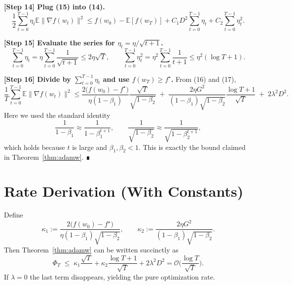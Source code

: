 \documentclass{article}
\begin{document}
\bigskip
\noindent\textbf{[Step 14] Plug (15) into (14).}
\[
\frac{1}{2}\sum_{t=0}^{T-1}\eta_t\mathbb{E}\|\nabla f(w_t)\|^2
\le f(w_0)-\mathbb{E}[f(w_T)]
+ C_1 D^2\sum_{t=0}^{T-1}\eta_t
+ C_2\sum_{t=0}^{T-1}\eta_t^2 .
\tag{16}
\]

\bigskip
\noindent\textbf{[Step 15] Evaluate the series for $\eta_t=\eta/\sqrt{t+1}$.}
\[
\sum_{t=0}^{T-1}\eta_t = \eta\sum_{t=0}^{T-1}\frac{1}{\sqrt{t+1}}
\le 2\eta\sqrt{T},
\qquad
\sum_{t=0}^{T-1}\eta_t^2 = \eta^2\sum_{t=0}^{T-1}\frac{1}{t+1}
\le \eta^2(\log T+1).
\tag{17}
\]

\bigskip
\noindent\textbf{[Step 16] Divide by $\sum_{t=0}^{T-1}\eta_t$ and use $f(w_T)\ge f^\star$.}
From (16) and (17),
\[
\frac{1}{T}\sum_{t=0}^{T-1}\mathbb{E}\|\nabla f(w_t)\|^2
\le
\frac{2\big(f(w_0)-f^\star\big)}{\eta(1-\beta_1)}\frac{\sqrt{T}}{\sqrt{1-\beta_2}}
\;+\;
\frac{2\eta G^2}{(1-\beta_1)\sqrt{1-\beta_2}}\frac{\log T+1}{\sqrt{T}}
\;+\;2\lambda^2 D^2 .
\]
Here we used the standard identity
\[
\frac{1}{1-\beta_1}\approx \frac{1}{1-\beta_1^{t+1}},\qquad
\frac{1}{\sqrt{1-\beta_2}}\approx \frac{1}{\sqrt{1-\beta_2^{t+1}}},
\]
which holds because $t$ is large and $\beta_1,\beta_2<1$.
This is exactly the bound claimed in Theorem~\ref{thm:adamw}. ∎

\section*{Rate Derivation (With Constants)}
Define
\[
\kappa_1:=\frac{2\big(f(w_0)-f^\star\big)}{\eta(1-\beta_1)\sqrt{1-\beta_2}},\qquad
\kappa_2:=\frac{2\eta G^2}{(1-\beta_1)\sqrt{1-\beta_2}}.
\]
Then Theorem~\ref{thm:adamw} can be written succinctly as
\[
\Phi_T\;\le\;\kappa_1\frac{\sqrt{T}}{\,}+ \kappa_2\frac{\log T+1}{\sqrt{T}}+2\lambda^2 D^2
= \mathcal{O}\!\Big(\frac{\log T}{\sqrt{T}}\Big).
\]
If $\lambda=0$ the last term disappears, yielding the pure optimization rate.

\end{document}
